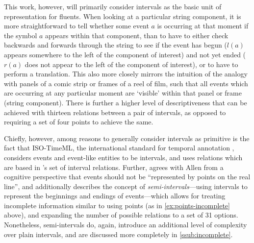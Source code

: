 \documentclass[a4paper,12pt,leqno,twoside]{article}
\begin{document}
This work, however, will primarily consider intervals as the basic unit of representation for fluents. When looking at a particular string component, it is more straightforward to tell whether some event $a$ is occurring at that moment if the symbol $a$ appears within that component, than to have to either check backwards and forwards through the string to see if the event has begun ($l(a)$ appears somewhere to the left of the component of interest) and not yet ended ($r(a)$ does not appear to the left of the component of interest), or to have to perform a translation. This also more closely mirrors the intuition of the analogy with panels of a comic strip or frames of a reel of film, such that all events which are occurring at any particular moment are `visible' within that panel or frame (string component). There is further a higher level of descriptiveness that can be achieved with thirteen relations between a pair of intervals, as opposed to requiring a set of four points to achieve the same.%

Chiefly, however, among reasons to generally consider intervals as primitive is the fact that ISO-TimeML, the international standard for temporal annotation \cite{pustejovsky2010iso}, considers events and event-like entities to be intervals, and uses relations which are based in \citet{allen1983maintaining}'s set of interval relations. Further, \citet[p. 201]{Freksa1992} agrees with Allen from a cognitive perspective that events should not be ``represented by points on the real line'', and additionally describes the concept of \textit{semi-intervals}---using intervals to represent the beginnings and endings of events---which allows for treating incomplete information similar to using points (as in \cref{ex:points-incomplete} above), and expanding the number of possible relations to a set of 31 options. Nonetheless, semi-intervals do, again, introduce an additional level of complexity over plain intervals, and are discussed more completely in \cref{ssub:incomplete}.

\end{document}
